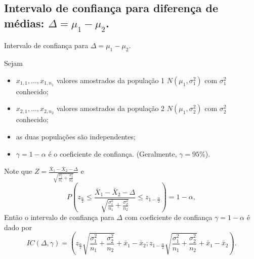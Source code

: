 \documentclass[9pt]{beamer}
\begin{document}
%
%

\subsection{Intervalo de confiança para diferença de médias: $\Delta = \mu_1 - \mu_2$.}

\begin{frame}{Intervalo de confiança para $\Delta = \mu_1-\mu_2$.}

\small

Sejam
\begin{itemize}
	\item $x_{1,1}, \dots, x_{1,n_1}$ valores amostrados da população 1 $N(\mu_1, \sigma_1^2)$ com $\sigma_1^2$ conhecido;
	\item $x_{2,1}, \dots, x_{2,n_2}$ valores amostrados da população 2 $N(\mu_1, \sigma_2^2)$ com $\sigma_2^2$ conhecido;
	\item as duas populações são independentes;
	\item $\gamma=1-\alpha$ é o coeficiente de confiança. (Geralmente, $\gamma=95\%$).
\end{itemize}

Note que $Z = \frac{\bar{X}_1 - \bar{X}_2 - \Delta}{\sqrt{ \frac{\sigma_1^2}{n_1} + \frac{\sigma_2^2}{n_2} }}$ e 
$$P\left( z_\frac{\alpha}{2} \leq \frac{\bar{X}_1 - \bar{X}_2 - \Delta}{\sqrt{ \frac{\sigma_1^2}{n_1} + \frac{\sigma_2^2}{n_2} }} \leq z_{1-\frac{\alpha}{2}} \right) = 1 - \alpha,$$
Então o intervalo de confiança para $\Delta$ com coeficiente de confiança $\gamma=1-\alpha$ é dado por
$$IC(\Delta, \gamma) = \left( z_{\frac{\alpha}{2}} \sqrt{\frac{\sigma_1^2}{n_1} + \frac{\sigma_2^2}{n_2}} + \bar{x}_1 - \bar{x}_2; z_{1-\frac{\alpha}{2}} \sqrt{\frac{\sigma_1^2}{n_1} + \frac{\sigma_2^2}{n_2}} + \bar{x}_1 - \bar{x}_2 \right).$$

\normalsize
\end{frame}
\end{document}
